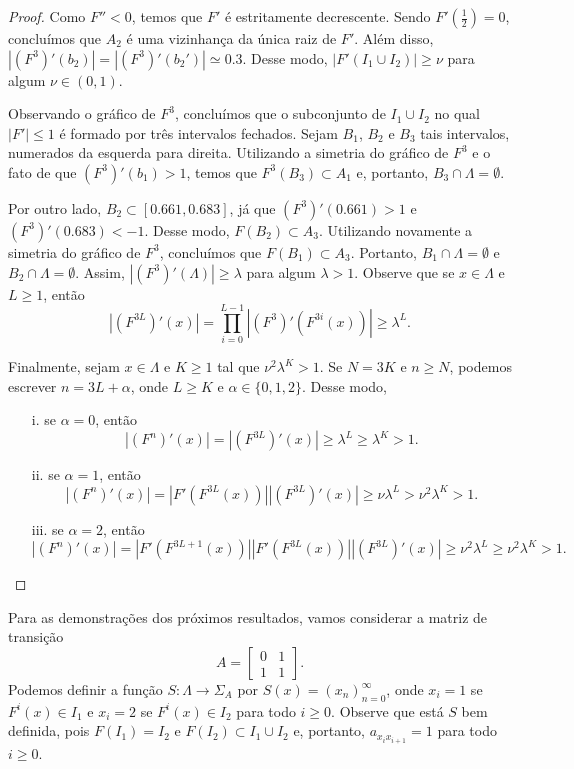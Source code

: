 \begin{proof}
Como $F'' < 0$, temos que $F'$ é estritamente decrescente. Sendo $F'\left(\frac{1}{2}\right) = 0$, concluímos que $A_2$ é uma vizinhança da única raiz de $F'$. Além disso, $|(F^3)'(b_2)| = |(F^3)'(b_2')| \simeq 0.3$. Desse modo, $|F'(I_1 \cup I_2)| \geq \nu$ para algum $\nu \in (0, 1)$.

Observando o gráfico de $F^3$, concluímos que o subconjunto de $I_1 \cup I_2$ no qual $|F'| \leq 1$ é formado por três intervalos fechados. Sejam $B_1$, $B_2$ e $B_3$ tais intervalos, numerados da esquerda para direita. Utilizando a simetria do gráfico de $F^3$ e o fato de que $(F^3)'(b_1) > 1$, temos que $F^3(B_3) \subset A_1$ e, portanto, $B_3 \cap \Lambda = \emptyset$.

Por outro lado, $B_2 \subset [0.661, 0.683]$, já que $(F^3)'(0.661) > 1$ e $(F^3)'(0.683) < -1$. Desse modo, $F(B_2) \subset A_3$. Utilizando novamente a simetria do gráfico de $F^3$, concluímos que $F(B_1) \subset A_3$. Portanto, $B_1 \cap \Lambda = \emptyset$ e $B_2 \cap \Lambda = \emptyset$. Assim, $|(F^3)'(\Lambda)| \geq \lambda$ para algum $\lambda > 1$. Observe que se $x \in \Lambda$ e $L \geq 1$, então
$$\left| \left(F^{3L}\right)'(x) \right| = 
\prod_{i=0}^{L-1} \left| \left( F^3 \right)' \left( F^{3i}(x) \right) \right|
\geq \lambda^L.$$

Finalmente, sejam $x \in \Lambda$ e $K \geq 1$ tal que $\nu^2 \lambda^K > 1$. Se $N = 3K$ e $n \geq N$, podemos escrever $n = 3L + \alpha$, onde $L \geq K$ e $\alpha \in \{ 0, 1, 2 \}$. Desse modo,
\begin{enumerate}
\item[i.] se $\alpha = 0$, então
$$ \left| \left(F^n\right)'(x) \right|
= \left| \left(F^{3L}\right)'(x) \right|
\geq \lambda^L \geq \lambda^K > 1.$$
\item[ii.] se $\alpha = 1$, então
$$ \left| \left(F^n\right)'(x) \right|
= \left| F' \left(F^{3L}(x) \right) \right|
\left| \left(F^{3L}\right)'(x) \right|
\geq \nu \lambda^L > \nu^2 \lambda^K > 1.$$
\item[iii.] se $\alpha = 2$, então
$$ \left| \left(F^n\right)'(x) \right|
= \left| F' \left(F^{3L + 1}(x) \right) \right|
\left| F' \left(F^{3L}(x) \right) \right|
\left| \left(F^{3L}\right)'(x) \right|
\geq \nu^2 \lambda^L \geq \nu^2 \lambda^K > 1.$$
\end{enumerate}


\end{proof}


Para as demonstrações dos próximos resultados, vamos considerar a matriz de transição
$$A = \begin{bmatrix}
0 & 1 \\
1 & 1
\end{bmatrix}.$$
Podemos definir a função $S: \Lambda \to \Sigma_A$ por $S(x) = (x_n)_{n=0}^\infty$, onde $x_i = 1$ se $F^i(x) \in I_1$ e $x_i = 2$ se $F^i(x) \in I_2$ para todo $i \geq 0$. Observe que está $S$ bem definida, pois $F(I_1) = I_2$ e $F(I_2) \subset I_1 \cup I_2$ e, portanto, $a_{x_i x_{i+1}} = 1$ para todo $i \geq 0$. 

